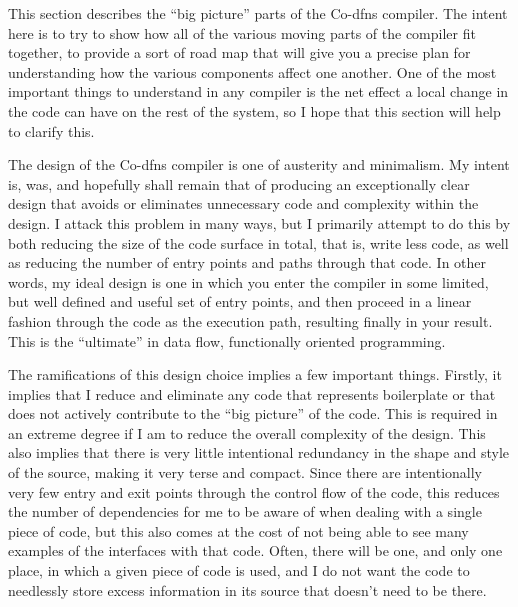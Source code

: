 \documentclass{article}%
\begin{document}
This section describes the ``big picture'' parts of the Co-dfns compiler.
The intent here is to try to show how all of the various moving parts
of the compiler fit together,
to provide a sort of road map that will give you a precise plan
for understanding how the various components affect one another.
One of the most important things to understand in any compiler
is the net effect a local change in the code
can have on the rest of the system,
so I hope that this section will help to clarify this.

The design of the Co-dfns compiler is one of austerity and minimalism.
My intent is, was, and hopefully shall remain that of producing an 
exceptionally clear design that avoids or eliminates unnecessary 
code and complexity within the design.
I attack this problem in many ways, but I primarily attempt to do 
this by both reducing the size of the code surface in total,
that is, write less code, as well as reducing the number of entry 
points and paths through that code. 
In other words, my ideal design is one in which you enter the 
compiler in some limited, but well defined and useful set of entry 
points, and then proceed in a linear fashion through the code as the
execution path, resulting finally in your result.
This is the ``ultimate'' in data flow, functionally oriented programming.

The ramifications of this design choice implies a few important things.
Firstly, it implies that I reduce and eliminate any code
that represents boilerplate or that does not actively contribute
to the ``big picture'' of the code.
This is required in an extreme degree if I am to reduce the overall
complexity of the design.
This also implies that there is very little intentional redundancy in 
the shape and style of the source,
making it very terse and compact.
Since there are intentionally very few entry and exit points through 
the control flow of the code, 
this reduces the number of dependencies for me to be aware of when 
dealing with a single piece of code,
but this also comes at the cost of not being able to see many examples
of the interfaces with that code. 
Often, there will be one, and only one place, in which a given piece 
of code is used, and I do not want the code to needlessly store 
excess information in its source that doesn't need to be there.
\end{document}
